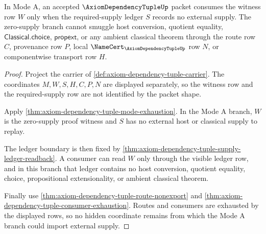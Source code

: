 \begin{theorem}
\label{thm:axiom-dependency-tuple-zero-supply-mode-soundness}
In Mode A, an accepted $\AxiomDependencyTupleUp$ packet consumes the witness
row $W$ only when the required-supply ledger $S$ records no external supply.
The zero-supply branch cannot smuggle host conversion, quotient equality,
$\mathsf{Classical.choice}$, $\mathsf{propext}$, or any ambient classical
theorem through the route row $C$, provenance row $P$, local
$\NameCert_{\AxiomDependencyTupleUp}$ row $N$, or componentwise transport row
$H$.
\end{theorem}
\begin{proof}
Project the carrier of \autoref{def:axiom-dependency-tuple-carrier}. The
coordinates $M,W,S,H,C,P,N$ are displayed separately, so the witness row and
the required-supply row are not identified by the packet shape.

Apply \autoref{thm:axiom-dependency-tuple-mode-exhaustion}. In the Mode A
branch, $W$ is the zero-supply proof witness and $S$ has no external host or
classical supply to replay.

The ledger boundary is then fixed by
\autoref{thm:axiom-dependency-tuple-supply-ledger-readback}. A consumer can
read $W$ only through the visible ledger row, and in this branch that ledger
contains no host conversion, quotient equality, choice, propositional
extensionality, or ambient classical theorem.

Finally use \autoref{thm:axiom-dependency-tuple-route-nonexport} and
\autoref{thm:axiom-dependency-tuple-consumer-exhaustion}. Routes and consumers
are exhausted by the displayed rows, so no hidden coordinate remains from which
the Mode A branch could import external supply.
\end{proof}

